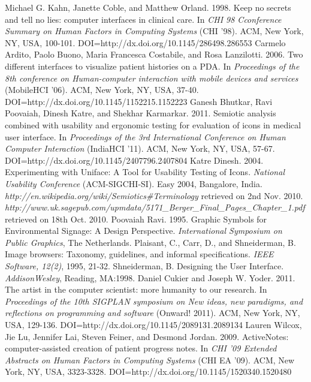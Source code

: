\begin{thebibliography}{}
\bibitem{} Michael G. Kahn, Janette Coble, and Matthew Orland. 1998. Keep no secrets and tell no lies: computer interfaces in clinical care. In \emph{CHI 98 Cconference Summary on Human Factors in Computing Systems} (CHI '98). ACM, New York, NY, USA, 100-101. DOI=http://dx.doi.org/10.1145/286498.286553
\bibitem{} Carmelo Ardito, Paolo Buono, Maria Francesca Costabile, and Rosa Lanzilotti. 2006. Two different interfaces to visualize patient histories on a PDA. In \emph{Proceedings of the 8th conference on Human-computer interaction with mobile devices and services} (MobileHCI '06). ACM, New York, NY, USA, 37-40. DOI=http://dx.doi.org/10.1145/1152215.1152223
\bibitem{} Ganesh Bhutkar, Ravi Poovaiah, Dinesh Katre, and Shekhar Karmarkar. 2011. Semiotic analysis combined with usability and ergonomic testing for evaluation of icons in medical user interface. In \emph{Proceedings of the 3rd International Conference on Human Computer Interaction} (IndiaHCI '11). ACM, New York, NY, USA, 57-67. DOI=http://dx.doi.org/10.1145/2407796.2407804
\bibitem{} Katre Dinesh. 2004. Experimenting with Uniface: A Tool for
Usability Testing of Icons. \emph{National Usability Conference} (ACM-SIGCHI-SI). Easy 2004, Bangalore, India.
\bibitem{} \emph{http://en.wikipedia.org/wiki/Semiotics\#Terminology} retrieved
on 2nd Nov. 2010.
\bibitem{} \emph{http://www.uk.sagepub.com/upmdata/5171\_Berger\_Final\_Pages\_Chapter\_1.pdf} retrieved on 18th Oct. 2010.
\bibitem{} Poovaiah Ravi. 1995. Graphic Symbols for Environmental
Signage: A Design Perspective. \emph{International Symposium on
Public Graphics}, The Netherlands.
\bibitem{} Plaisant, C., Carr, D., and Shneiderman, B. Image browsers:
Taxonomy, guidelines, and informal specifications. \emph{IEEE
Software, 12(2)}, 1995, 21-32.
\bibitem{} Shneiderman, B. Designing the User Interface. \emph{AddisonWesley},
Reading, MA:1998.
\bibitem{} Daniel Cukier and Joseph W. Yoder. 2011. The artist in the computer scientist: more humanity to our research. In \emph{Proceedings of the 10th SIGPLAN symposium on New ideas, new paradigms, and reflections on programming and software} (Onward! 2011). ACM, New York, NY, USA, 129-136. DOI=http://dx.doi.org/10.1145/2089131.2089134
\bibitem{} Lauren Wilcox, Jie Lu, Jennifer Lai, Steven Feiner, and Desmond Jordan. 2009. ActiveNotes: computer-assisted creation of patient progress notes. In \emph{CHI '09 Extended Abstracts on Human Factors in Computing Systems} (CHI EA '09). ACM, New York, NY, USA, 3323-3328. DOI=http://dx.doi.org/10.1145/1520340.1520480

\end{thebibliography}
